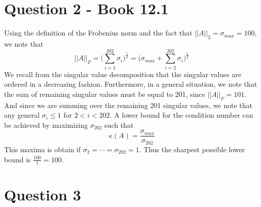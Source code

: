\documentclass[a4paper,12pt]{article}
\begin{document}
\section{Question 2 - Book 12.1}
Using the definition of the Frobenius norm and the fact that $||A||_2 = \sigma_{max} = 100$, we note that
\begin{equation}
||A||_F = \bigg( \sum_{i=1}^{202} \sigma_i \bigg)^{\frac{1}{2}} = \bigg( \sigma_{max} + \sum_{i=2}^{202} \sigma_i \bigg)^{\frac{1}{2}}
\end{equation}  We recall from the singular value decomposition that the singular values are ordered in a decreasing fashion. Furthermore, in a general situation, we note that the sum of remaining singular values must be equal to 201, since $||A||_F =101$. And since we are summing over the remaining 201 singular values, we note that any general $\sigma_i \leq 1$ for $2<i<202$. A lower bound for the condition number can be achieved by maximizing $\sigma_{202}$ such that
\begin{equation}
\kappa(A)=\frac{\sigma_{max}}{\sigma_{202}}
\end{equation} This maxima is obtain if $\sigma_2 = \cdots = \sigma_{202}=1$. Thus the sharpest possible lower bound is $\frac{100}{1}=100$.







\section{Question 3}
\end{document}
